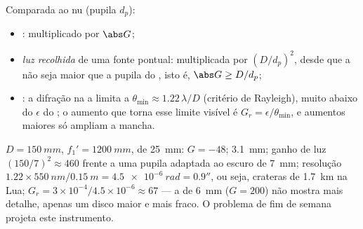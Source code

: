 \begin{proposition}\label{prop:b1:optical-instruments:gains}
Comparada ao  nu (pupila $d_p$):
\begin{itemize}
  \item \emph{}: multiplicado por $\abs G$;
  \item \emph{luz recolhida} de uma fonte pontual: multiplicada por
        $(D/d_p)^2$, desde que a  não seja maior que a
        pupila do , isto é, $\abs G \geq D/d_p$;
  \item \emph{}: a difração na  a limita
        a $\theta_{\min} \approx 1.22\,\lambda/D$ (critério de
        Rayleigh), muito abaixo do $\epsilon$ do ; o aumento
        que torna esse limite visível é $G_r = \epsilon/\theta_{\min}$,
        e aumentos maiores só ampliam a mancha.
\end{itemize}
\end{proposition}
\admitted

\begin{example}\label{ex:b1:optical-instruments:telnum}
$D = \qty{150}{mm}$, $f_1' = \qty{1200}{mm}$,  de \qty{25}{mm}:
$G = -48$;  \qty{3.1}{mm}; ganho de luz $(150/7)^2 \approx
460$ frente a uma pupila adaptada ao escuro de \qty{7}{mm}; resolução $1.22 \times
\qty{550}{nm}/\qty{0.15}{m} = \qty{4.5e-6}{rad} = 0.9''$, ou seja,
crateras de \qty{1.7}{km} na Lua; $G_r = 3\times10^{-4}/4.5\times
10^{-6} \approx 67$ --- a  de \qty{6}{mm} ($G = 200$) não mostra
mais detalhe, apenas um disco maior e mais fraco. O problema de fim de semana projeta
este instrumento.
\end{example}

